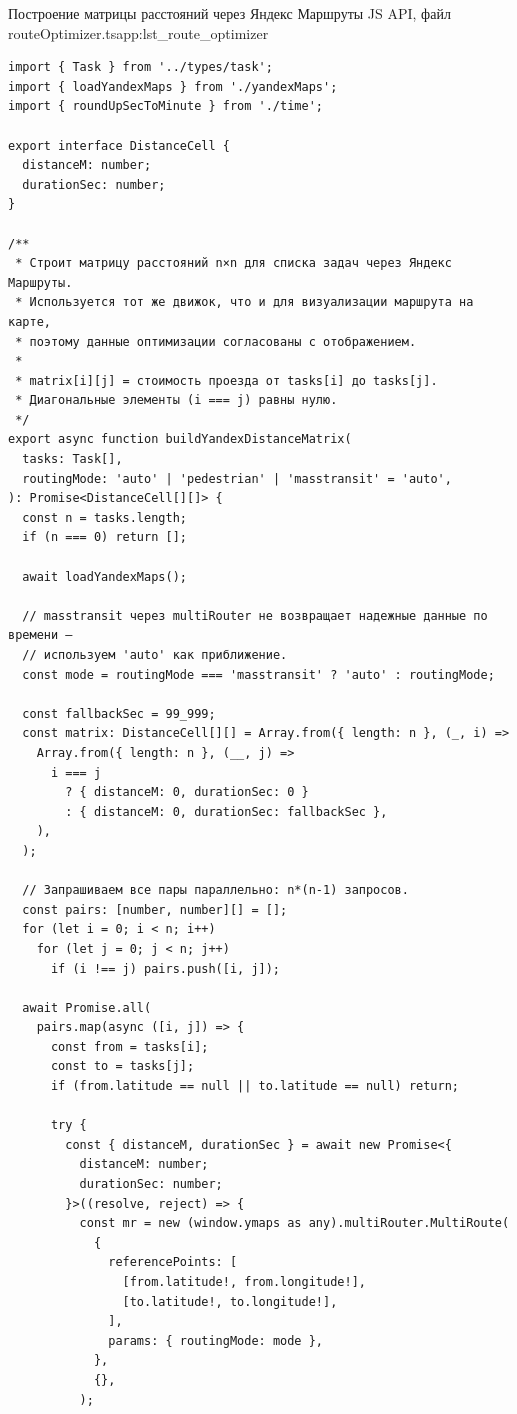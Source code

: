 \begin{codelisting}{Построение матрицы расстояний через Яндекс Маршруты JS API, файл routeOptimizer.ts}{app:lst_route_optimizer}
  \begin{verbatim}
import { Task } from '../types/task';
import { loadYandexMaps } from './yandexMaps';
import { roundUpSecToMinute } from './time';

export interface DistanceCell {
  distanceM: number;
  durationSec: number;
}

/**
 * Строит матрицу расстояний n×n для списка задач через Яндекс Маршруты.
 * Используется тот же движок, что и для визуализации маршрута на карте,
 * поэтому данные оптимизации согласованы с отображением.
 *
 * matrix[i][j] = стоимость проезда от tasks[i] до tasks[j].
 * Диагональные элементы (i === j) равны нулю.
 */
export async function buildYandexDistanceMatrix(
  tasks: Task[],
  routingMode: 'auto' | 'pedestrian' | 'masstransit' = 'auto',
): Promise<DistanceCell[][]> {
  const n = tasks.length;
  if (n === 0) return [];

  await loadYandexMaps();

  // masstransit через multiRouter не возвращает надежные данные по времени —
  // используем 'auto' как приближение.
  const mode = routingMode === 'masstransit' ? 'auto' : routingMode;

  const fallbackSec = 99_999;
  const matrix: DistanceCell[][] = Array.from({ length: n }, (_, i) =>
    Array.from({ length: n }, (__, j) =>
      i === j
        ? { distanceM: 0, durationSec: 0 }
        : { distanceM: 0, durationSec: fallbackSec },
    ),
  );

  // Запрашиваем все пары параллельно: n*(n-1) запросов.
  const pairs: [number, number][] = [];
  for (let i = 0; i < n; i++)
    for (let j = 0; j < n; j++)
      if (i !== j) pairs.push([i, j]);

  await Promise.all(
    pairs.map(async ([i, j]) => {
      const from = tasks[i];
      const to = tasks[j];
      if (from.latitude == null || to.latitude == null) return;

      try {
        const { distanceM, durationSec } = await new Promise<{
          distanceM: number;
          durationSec: number;
        }>((resolve, reject) => {
          const mr = new (window.ymaps as any).multiRouter.MultiRoute(
            {
              referencePoints: [
                [from.latitude!, from.longitude!],
                [to.latitude!, to.longitude!],
              ],
              params: { routingMode: mode },
            },
            {},
          );


\end{verbatim}
\end{codelisting}
